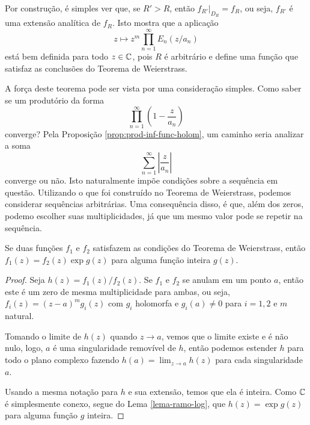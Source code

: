     Por construção, é simples ver que, se $R'>R$, então $f_{R'}|_{D_R} = f_R$, ou seja, $f_{R'}$ é uma extensão analítica de $f_R$. Isto mostra que a aplicação
    $$ z \mapsto z^m \prod_{n=1}^{\infty}E_n(z/a_n) $$
    está bem definida para todo $z \in \mathbb{C}$, pois $R$ é arbitrário e define uma função que satisfaz as conclusões do Teorema de Weierstrass.
    
    A força deste teorema pode ser vista por uma consideração simples. Como saber se um produtório da forma
    $$\prod_{n=1}^{\infty} \left( 1 - \frac{z}{a_n} \right)$$
    converge? Pela Proposição \ref{prop:prod-inf-func-holom}, um caminho seria analizar a soma 
    $$\sum_{n=1}^{\infty} \left | \frac{z}{a_n} \right |$$
    converge ou não. Isto naturalmente impõe condições sobre a sequência em questão. Utilizando o que foi construído no Teorema de Weierstrass, podemos considerar sequências arbitrárias. Uma consequência disso, é que, além dos zeros, podemo escolher suas multiplicidades, já que um mesmo valor pode se repetir na sequência.
    
    \begin{corolario}
    Se duas funções $f_1$ e $f_2$ satisfazem as condições do Teorema de Weierstrass, então $f_1(z) = f_2(z)\exp{g(z)}$ para alguma função inteira $g(z)$. 
    \end{corolario}
    \begin{proof}
    Seja $h(z) = f_1(z)/f_2(z)$. Se $f_1$ e $f_2$ se anulam em um ponto $a$, então este é um zero de mesma multiplicidade para ambas, ou seja, $f_i(z) = (z-a)^mg_i(z)$ com $g_i$ holomorfa e $g_i(a) \neq 0$ para  $i = 1,2$ e $m$ natural. 
    
    Tomando o limite de $h(z)$ quando $z \to a$, vemos que o limite existe e é não nulo, logo, $a$ é uma singularidade removível de $h$, então podemos estender $h$ para todo o plano complexo fazendo $h(a) = \lim_{z \to a} h(z)$ para cada singularidade $a$.
    
    Usando a mesma notação para $h$ e sua extensão, temos que ela é inteira. Como $\mathbb{C}$ é simplesmente conexo, segue do Lema \ref{lema-ramo-log}, que $h(z) = \exp{g(z)}$ para alguma função $g$ inteira.
    \end{proof}
    

    

    
    